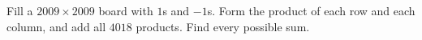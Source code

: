 Fill a $2009\times2009$ board with $1$s and $-1$s. Form the product of each row and each column, and add all $4018$ products. Find every possible sum.
